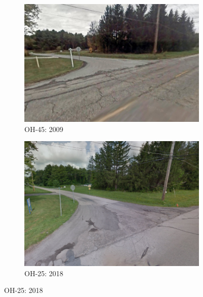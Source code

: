\begin{figure}[htbp]
    \centering
    \begin{minipage}[b]{0.49\textwidth}
        \centering
        \begin{subfigure}[b]{\textwidth}
            \centering
            \includegraphics[width=\textwidth,keepaspectratio]{images/morgan_township_2801OH-45_2009.png}
            \caption{OH-45: 2009}
            \label{fig:morgan_oh_2009}
        \end{subfigure}
    \end{minipage}
    \hfill
    \begin{minipage}[b]{0.49\textwidth}
        \centering
        \begin{subfigure}[b]{\textwidth}
            \centering
            \includegraphics[width=\textwidth,keepaspectratio]{images/morgan_township_2801OH-45_2018.png}
            \caption{OH-25: 2018}
            \label{fig:morgan_oh_2018}
        \end{subfigure}
    \end{minipage}


\end{figure}

